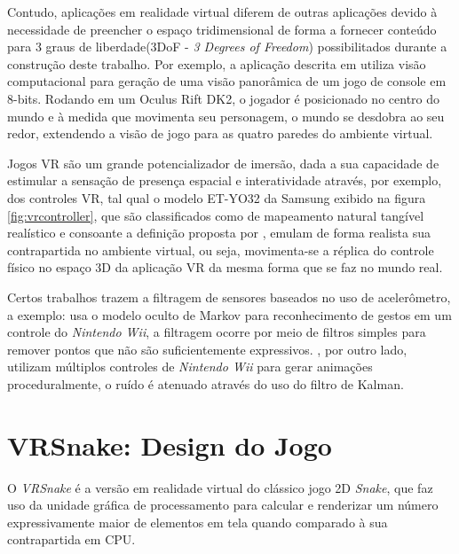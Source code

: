 \documentclass[conference]{IEEEtran}
\begin{document}
 Contudo, aplicações em realidade virtual diferem de outras aplicações devido à necessidade de preencher o espaço tridimensional de forma a fornecer conteúdo para 3 graus de liberdade(3DoF - \textit{3 Degrees of Freedom}) possibilitados durante a construção deste trabalho. Por exemplo, a aplicação descrita em \cite{zund2015unfolding} utiliza visão computacional para geração de uma visão panorâmica de um jogo de console em 8-bits. Rodando em um Oculus Rift DK2, o jogador é posicionado no centro do mundo e à medida que movimenta seu personagem, o mundo se desdobra ao seu redor, extendendo a visão de jogo para as quatro paredes do ambiente virtual.

Jogos VR são um grande potencializador de imersão, dada a sua capacidade de estimular a sensação de presença espacial e interatividade \cite{seibert2017control} através, por exemplo, dos controles VR, tal qual o modelo ET-YO32 da Samsung exibido na figura \ref{fig:vrcontroller}, que são classificados como de mapeamento natural tangível realístico e consoante a definição proposta por \cite{skalski2011mapping}, emulam de forma realista sua contrapartida no ambiente virtual, ou seja, movimenta-se a réplica do controle físico no espaço 3D da aplicação VR da mesma forma que se faz no mundo real.

Certos trabalhos trazem a filtragem de sensores baseados no uso de acelerômetro, a exemplo: \cite{schlomer2008gesture} usa o modelo oculto de Markov para reconhecimento de gestos em um controle do \textit{Nintendo Wii}, a filtragem ocorre por meio de filtros simples para remover pontos que não são suficientemente expressivos. \cite{shiratori2008accelerometer}, por outro lado, utilizam múltiplos controles de \textit{Nintendo Wii} para gerar animações proceduralmente, o ruído é atenuado através do uso do filtro de Kalman.


\section{VRSnake: Design do Jogo} \label{sec:vrsnake}
O \textit{VRSnake} é a versão em realidade virtual do clássico jogo 2D \textit{Snake}, que faz uso da unidade gráfica de processamento para calcular e renderizar um número expressivamente maior de elementos em tela quando comparado à sua contrapartida em CPU. 
\end{document}
